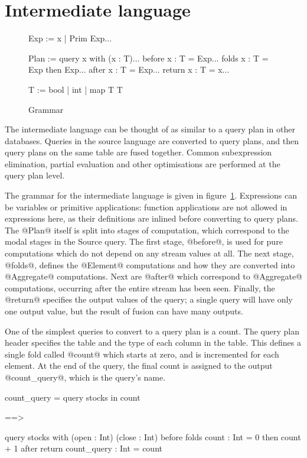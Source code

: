 \section{Intermediate language}
\label{s:IcicleCore}

\begin{figure}

\begin{code}
Exp   := x | Prim Exp...

Plan  := query  x with (x : T)...
       before { x : T = Exp... }
       folds  { x : T = Exp then Exp... }
       after  { x : T = Exp... }
       return { x : T = x... }

T     := bool | int | map T T
\end{code}


\caption{Grammar}
\label{fig:core:grammar}
\end{figure}

The intermediate language can be thought of as similar to a query plan in other databases.
Queries in the source language are converted to query plans, and then query plans on the same table are fused together.
Common subexpression elimination, partial evaluation and other optimisations are performed at the query plan level.

The grammar for the intermediate language is given in figure~\ref{fig:core:grammar}.
Expressions can be variables or primitive applications: function applications are not allowed in expressions here, as their definitions are inlined before converting to query plans.
The @Plan@ itself is split into stages of computation, which correspond to the modal stages in the Source query.
The first stage, @before@, is used for pure computations which do not depend on any stream values at all.
The next stage, @folds@, defines the @Element@ computations and how they are converted into @Aggregate@ computations.
Next are @after@ which correspond to @Aggregate@ computations, occurring after the entire stream has been seen.
Finally, the @return@ specifies the output values of the query; a single query will have only one output value, but the result of fusion can have many outputs.

One of the simplest queries to convert to a query plan is a count.
The query plan header specifies the table and the type of each column in the table.
This defines a single fold called @count@ which starts at zero, and is incremented for each element.
At the end of the query, the final count is assigned to the output @count_query@, which is the query's name.
\begin{code}
count_query =
query stocks
in    count

==>

query stocks with (open : Int) (close : Int)
before { }
folds  { count : Int = 0 then count + 1 }
after  { }
return { count_query : Int = count }
\end{code}

